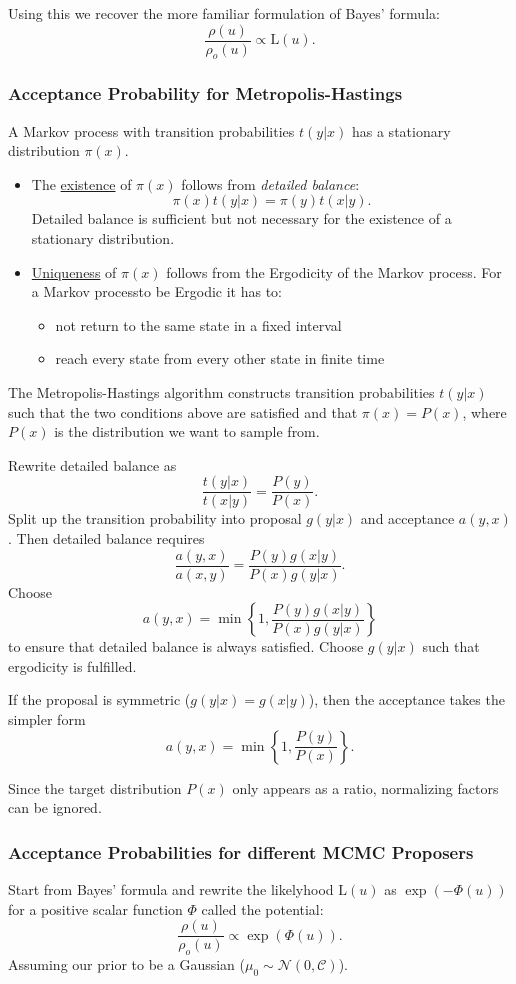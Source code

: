 \documentclass[11pt]{article}
\newcommand{\C}{{\mathcal{C}}}
\newcommand{\N}[2]{\mathcal{N}\left(#1,#2\right)}
\begin{document}
Using this we recover the more familiar formulation of Bayes' formula:
$$\frac{\rho(u)}{\rho_o(u)} \propto \text{L}(u).$$

\subsubsection{Acceptance Probability for Metropolis-Hastings}
\label{sec:org1c2fb5c}
A Markov process with transition probabilities \(t(y|x)\) has a stationary distribution \(\pi(x)\).
\begin{itemize}
\item The \uline{existence} of \(\pi(x)\) follows from \emph{detailed balance}:
$$\pi(x)t(y|x) = \pi(y)t(x|y).$$
Detailed balance is sufficient but not necessary for the existence of a stationary distribution.
\item \uline{Uniqueness} of \(\pi(x)\) follows from the Ergodicity of the Markov process. For a Markov
processto be Ergodic it has to:
\begin{itemize}
\item not return to the same state in a fixed interval
\item reach every state from every other state in finite time
\end{itemize}
\end{itemize}

The Metropolis-Hastings algorithm constructs transition probabilities \(t(y|x)\) such that the
two conditions above are satisfied and that \(\pi(x) = P(x)\), where \(P(x)\) is the distribution
we want to sample from.

Rewrite detailed balance as
$$\frac{t(y|x)}{t(x|y)} = \frac{P(y)}{P(x)}.$$
Split up the transition probability into proposal \(g(y|x)\) and acceptance \(a(y,x)\). Then detailed
balance requires
$$\frac{a(y,x)}{a(x,y)} = \frac{P(y)g(x|y)}{P(x)g(y|x)}.$$
Choose
$$a(y,x) = \min\left\{1, \frac{P(y)g(x|y)}{P(x)g(y|x)}\right\}$$
to ensure that detailed balance is always satisfied. Choose \(g(y|x)\) such that ergodicity
is fulfilled.

If the proposal is symmetric (\(g(y|x) = g(x|y)\)), then the acceptance takes the simpler form
$$a(y,x) = \min\left\{1, \frac{P(y)}{P(x)}\right\}.$$

Since the target distribution \(P(x)\) only appears as a ratio, normalizing factors can be ignored.
\subsubsection{Acceptance Probabilities for different MCMC Proposers}
\label{sec:orgbfbcbe1}
Start from Bayes' formula and rewrite the likelyhood \(\text{L}(u)\) as \(\exp(-\Phi(u))\) for
a positive scalar function \(\Phi\) called the potential:
$$\frac{\rho(u)}{\rho_o(u)} \propto \exp(\Phi(u)).$$
Assuming our prior to be a Gaussian (\(\mu_0 \sim \N{0}{\C}\)).
\end{document}
